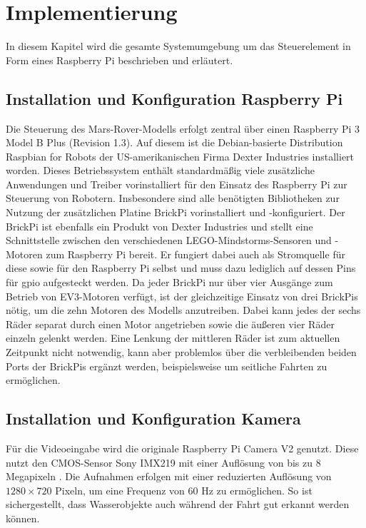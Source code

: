 \chapter{Implementierung}
\label{chp:implementierung}

In diesem Kapitel wird die gesamte Systemumgebung um das Steuerelement in Form eines Raspberry Pi beschrieben und erläutert.


\section{Installation und Konfiguration Raspberry Pi}
\label{sec:inst_konf_raspi}

Die Steuerung des Mars-Rover-Modells erfolgt zentral über einen Raspberry Pi 3 Model B Plus (Revision 1.3).
Auf diesem ist die Debian-basierte Distribution Raspbian for Robots der US-amerikanischen Firma Dexter Industries installiert worden.
Dieses Betriebssystem enthält standardmäßig viele zusätzliche Anwendungen und Treiber vorinstalliert für den Einsatz des Raspberry Pi zur Steuerung von Robotern.
Insbesondere sind alle benötigten Bibliotheken zur Nutzung der zusätzlichen Platine BrickPi vorinstalliert und -konfiguriert.
Der BrickPi ist ebenfalls ein Produkt von Dexter Industries und stellt eine Schnittstelle zwischen den verschiedenen LEGO-Mindstorms-Sensoren und -Motoren zum Raspberry Pi bereit.
Er fungiert dabei auch als Stromquelle für diese sowie für den Raspberry Pi selbst und muss dazu lediglich auf dessen Pins für \acf{gpio} aufgesteckt werden.
Da jeder BrickPi nur über vier Ausgänge zum Betrieb von EV3-Motoren verfügt, ist der gleichzeitige Einsatz von drei BrickPis nötig, um die zehn Motoren des Modells anzutreiben.
Dabei kann jedes der sechs Räder separat durch einen Motor angetrieben sowie die äußeren vier Räder einzeln gelenkt werden.
Eine Lenkung der mittleren Räder ist zum aktuellen Zeitpunkt nicht notwendig, kann aber problemlos über die verbleibenden beiden Ports der BrickPis ergänzt werden, beispielsweise um seitliche Fahrten zu ermöglichen.

\section{Installation und Konfiguration Kamera}
\label{sec:inst_konf_kamera}

Für die Videoeingabe wird die originale Raspberry Pi Camera V2 genutzt.
Diese nutzt den CMOS-Sensor Sony IMX219 mit einer Auflösung von bis zu 8 Megapixeln \cite{pagnutti2017}.
Die Aufnahmen erfolgen mit einer reduzierten Auflösung von $1280 \times 720$ Pixeln, um eine Frequenz von 60 Hz zu ermöglichen. 
So ist sichergestellt, dass Wasserobjekte auch während der Fahrt gut erkannt werden können.


